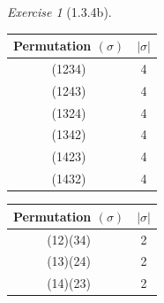 \documentclass[12pt]{amsart}
\makeatletter
\theoremstyle{remark}
\newtheorem*{exercise}{Exercise}%
\renewenvironment{proof}[1][\proofname]{\par\doublespacing
  \pushQED{\qed}%
  \normalfont \topsep6\p@\@plus6\p@\relax
  \list{}{%
    \settowidth{\leftmargin}{\itshape\proofname:\hskip\labelsep}%
    \setlength{\labelwidth}{0pt}%
    \setlength{\itemindent}{-\leftmargin}%
  }%
  \item[\hskip\labelsep\itshape#1\@addpunct{:}]\ignorespaces
}{%
  \popQED\endlist\@endpefalse
  \singlespacing
}
\theoremstyle{mycomment}
\makeatother
\begin{document}
\begin{exercise}[1.3.4b]
\begin{proof}[Solution:]
    \begin{center}
      \begin{minipage}{.45\textwidth}
            \begin{tabular}{c | c } 
              Permutation $(\sigma)$ & $|\sigma|$ \\ 
              \hline
              (1234) & 4\\
              (1243) & 4\\
              (1324) & 4\\
              (1342) & 4\\
              (1423) & 4\\
              (1432) & 4
            \end{tabular}
          \end{minipage}
          \hfill
          \begin{minipage}{.45\textwidth}
              \begin{tabular}{c | c } 
                Permutation $(\sigma)$ & $|\sigma|$ \\ 
                \hline
                (12)(34)& 2\\
                (13)(24)& 2\\
                (14)(23)& 2
              \end{tabular}
            \end{minipage}     
          \end{center}
          
    \end{proof}
    
  \end{exercise}


  
\end{document}
